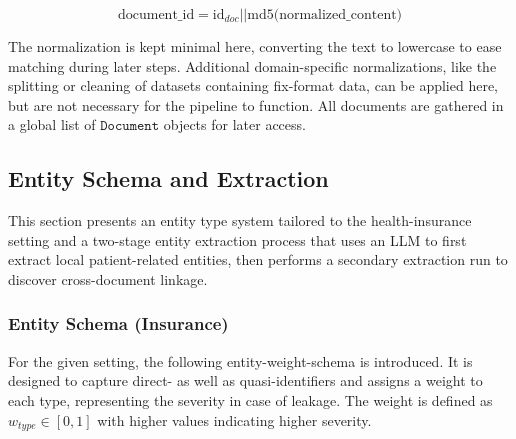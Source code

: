 \[\mbox{document\_id} = \mbox{id}_{doc} \vert\vert \mbox{md5(normalized\_content)}\]

The normalization is kept minimal here, converting the text to lowercase to ease matching during later steps. Additional domain-specific normalizations, like the splitting or cleaning of datasets containing fix-format data, can be applied here, but are not necessary for the pipeline to function.
All documents are gathered in a global list of $\texttt{Document}$ objects for later access.

\subsection{Entity Schema and Extraction}
This section presents an entity type system tailored to the health-insurance setting and a two-stage entity extraction process that uses an LLM to first extract local patient-related entities, then performs a secondary extraction run to discover cross-document linkage.

\subsubsection{Entity Schema (Insurance)}\label{approach-subsubsec:entity_schema}
For the given setting, the following entity-weight-schema is introduced. It is designed to capture direct- as well as quasi-identifiers and assigns a weight to each type, representing the severity in case of leakage. The weight is defined as $w_{type}\in[0,1]$ with higher values indicating higher severity.

